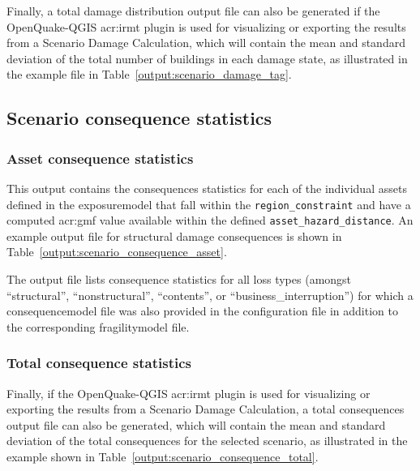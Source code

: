 Finally, a total damage distribution output file can also be generated if the
OpenQuake-QGIS \gls{acr:irmt} plugin is used for visualizing or exporting the
results from a Scenario Damage Calculation, which will contain the mean and
standard deviation of the total number of buildings in each damage state, as
illustrated in the example file in Table~\ref{output:scenario_damage_tag}.




\subsection{Scenario consequence statistics}
\label{subsec:scenario_consequence_statistics}

\subsubsection{Asset consequence statistics}
\label{subsubsec:scenario_asset_consequence_statistics}

This output contains the consequences statistics for each of the individual
\glspl{asset} defined in the \gls{exposuremodel} that fall within the
\Verb+region_constraint+ and have a computed \gls{acr:gmf} value available
within the defined \Verb+asset_hazard_distance+. An example output file for
structural damage consequences is shown in
Table~\ref{output:scenario_consequence_asset}.



The output file lists consequence statistics for all loss types (amongst
``structural'', ``nonstructural'', ``contents'', or
``business\_interruption'') for which a \gls{consequencemodel} file was also
provided in the configuration file in addition to the corresponding
\gls{fragilitymodel} file.


\subsubsection{Total consequence statistics}
\label{subsubsec:scenario_total_consequence_statistics}

Finally, if the OpenQuake-QGIS \gls{acr:irmt} plugin is used for visualizing
or exporting the results from a Scenario Damage Calculation, a total
consequences output file can also be generated, which will contain the mean and
standard deviation of the total consequences for the selected scenario, as
illustrated in the example shown in
Table~\ref{output:scenario_consequence_total}.


